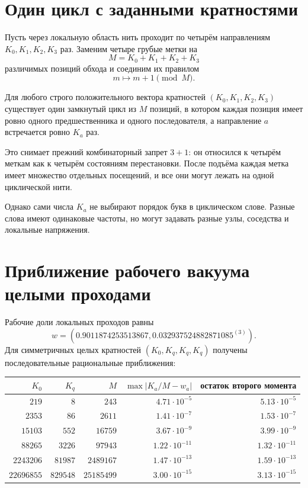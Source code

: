 \section{Один цикл с заданными кратностями}

Пусть через локальную область нить проходит по четырём направлениям
$K_0,K_1,K_2,K_3$ раз. Заменим четыре грубые метки на
\begin{equation}
 M=K_0+K_1+K_2+K_3
\end{equation}
различимых позиций обхода и соединим их правилом
\begin{equation}
 m\longmapsto m+1\pmod M.
\end{equation}

\begin{theorem}
Для любого строго положительного вектора кратностей
$(K_0,K_1,K_2,K_3)$ существует один замкнутый цикл из $M$ позиций, в
котором каждая позиция имеет ровно одного предшественника и одного
последователя, а направление $a$ встречается ровно $K_a$ раз.
\end{theorem}

Это снимает прежний комбинаторный запрет $3+1$: он относился к четырём
меткам как к четырём состояниям перестановки. После подъёма каждая метка
имеет множество отдельных посещений, и все они могут лежать на одной
циклической нити.

Однако сами числа $K_a$ не выбирают порядок букв в циклическом слове.
Разные слова имеют одинаковые частоты, но могут задавать разные узлы,
соседства и локальные напряжения.

\section{Приближение рабочего вакуума целыми проходами}

Рабочие доли локальных проходов равны
\begin{equation}
 w=(0.9011874253513867,
 0.032937524882871085^{(3)}).
\end{equation}
Для симметричных целых кратностей $(K_0,K_q,K_q,K_q)$ получены
последовательные рациональные приближения:

\begin{center}
\begin{tabular}{r|r|r|r|r}
$K_0$ & $K_q$ & $M$ & $\max|K_a/M-w_a|$ & остаток второго момента\\
\hline
$219$ & $8$ & $243$ & $4.71\cdot10^{-5}$ & $5.13\cdot10^{-5}$\\
$2353$ & $86$ & $2611$ & $1.41\cdot10^{-7}$ & $1.53\cdot10^{-7}$\\
$15103$ & $552$ & $16759$ & $3.67\cdot10^{-9}$ & $3.99\cdot10^{-9}$\\
$88265$ & $3226$ & $97943$ & $1.22\cdot10^{-11}$ & $1.32\cdot10^{-11}$\\
$2243206$ & $81987$ & $2489167$ & $1.47\cdot10^{-13}$ & $1.59\cdot10^{-13}$\\
$22696855$ & $829548$ & $25185499$ & $3.00\cdot10^{-15}$ & $3.13\cdot10^{-15}$
\end{tabular}
\end{center}

